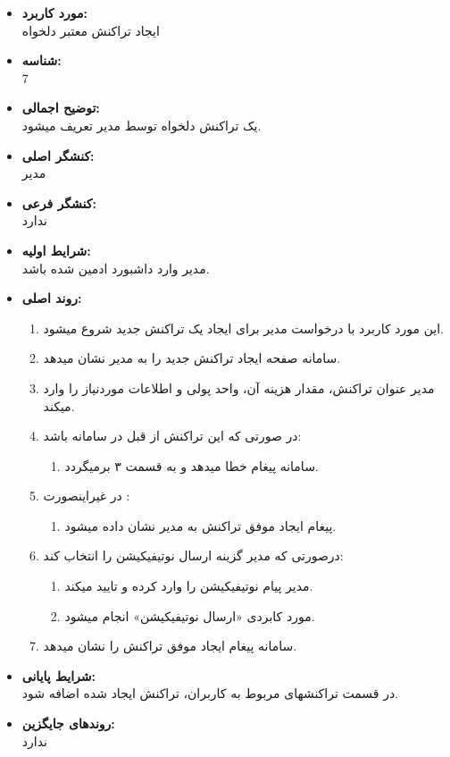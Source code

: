 \documentclass{article}
\begin{document}
\begin{itemize}
\item \textbf{مورد کاربرد:}\\
ایجاد تراکنش معتبر دلخواه
\item \textbf{شناسه:}\\
7
\item \textbf{توضیح اجمالی:}\\
یک تراکنش دلخواه توسط مدیر تعریف میشود.
\item \textbf{کنشگر اصلی:}\\
مدیر
\item \textbf{کنشگر فرعی:}\\
ندارد
\item \textbf{شرایط اولیه:}\\
مدیر وارد داشبورد ادمین شده باشد.
\item \textbf{روند اصلی:}\\
\begin{enumerate}
\item  این مورد کاربرد با درخواست مدیر برای ایجاد یک تراکنش جدید شروع میشود.
\item سامانه صفحه ایجاد تراکنش جدید را به مدیر نشان میدهد.
\item مدیر عنوان تراکنش، مقدار هزینه آن، واحد پولی و اطلاعات موردنیاز را وارد میکند.
\item در صورتی که این تراکنش از قبل در سامانه باشد:
\begin{enumerate}
\item سامانه پیغام خطا میدهد و به قسمت ۳ برمیگردد. 
\end{enumerate}

\item در غیراینصورت	:
\begin{enumerate}
\item پیغام ایجاد موفق تراکنش به مدیر نشان داده میشود.
\end{enumerate}
\item  درصورتی که مدیر گزینه ارسال نوتیفیکیشن را انتخاب کند:
\begin{enumerate}
\item مدیر پیام نوتیفیکیشن را وارد کرده و تایید میکند.
\item مورد کابردی «ارسال نوتیفیکیشن» انجام میشود.
\end{enumerate}
\item سامانه پیغام ایجاد موفق تراکنش را نشان میدهد.
\end{enumerate}

\item \textbf{شرایط پایانی:}\\ 
در قسمت تراکنشهای مربوط به کاربران، تراکنش ایجاد شده اضافه شود.
\item \textbf{روندهای جایگزین:}\\
ندارد
\end{itemize}
\end{document}
